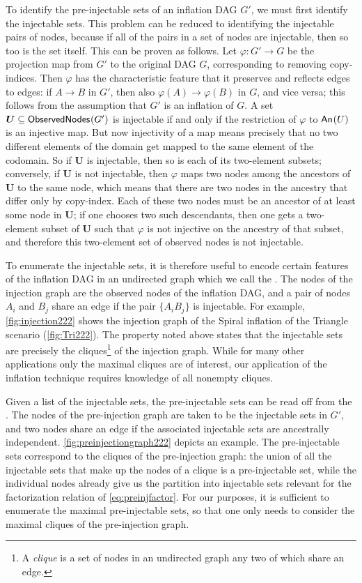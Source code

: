 \documentclass[aps,english,superscriptaddress,onecolumn,twoside,longbibliography,pra,floatfix,fleqn,nofootinbib]{revtex4-1}%
\newcommand*{\tblue}[1]{{\color{MidnightBlue}{\textbf{#1}}}}
\theoremstyle{definition}
\newcounter{example}[section]
\newcommand{\An}[2][]{{\mathsf{An}_{#1}}\parenths{#2}}
\newcommand{\SmallNamedFunction}[3][]{\operatorname{\mathsf{#2}}_{#1}\parenths{#3}}
\newcommand{\obsnodes}[1]{\SmallNamedFunction{ObservedNodes}{#1}}
\DeclarePairedDelimiter{\parenths}{\lparen}{\rparen}
\begin{document}
To identify the pre-injectable sets of an inflation DAG $G'$, we must first identify the injectable sets. This problem can be reduced to identifying the injectable pairs of nodes, because if all of the pairs in a set of nodes are injectable, then so too is the set itself. This can be proven as follows.   
Let $\varphi : G' \to G$ be the projection map from $G'$ to the original DAG $G$, corresponding to removing copy-indices.  Then $\varphi$ has the characteristic feature that it preserves and reflects edges to edges: if $A  \to B$ in $G'$, then also $\varphi(A) \to \varphi(B)$ in $G$, and vice versa; this follows from the assumption that $G'$ is an inflation of $G$. 
A set $\bm{U} \subseteq \obsnodes{G'}$ is injectable if and only if the
restriction of $\varphi$ to $\An{U}$ is an injective map. 
But now injectivity of a map means precisely that no two different
elements of the domain get mapped to the same element of the codomain.
So if $\bm{U}$ is injectable, then so is each of its two-element subsets;
conversely, if $\bm{U}$ is not injectable, then $\varphi$ maps two nodes among the
ancestors of $\bm{U}$ to the same node, which means that there are two nodes in the
ancestry that differ only by copy-index. Each of these two nodes must be
an ancestor of at least some node in $\bm{U}$; if one chooses two such
descendants, then one gets a two-element subset of $\bm{U}$ such that $\varphi$ is not
injective on the ancestry of that subset, and therefore this two-element
set of observed nodes is not injectable.

To enumerate the injectable sets, it is therefore useful to encode certain features of the inflation DAG in an undirected graph which we call the \tblue{injection graph}. The nodes of the injection graph are the observed nodes of the inflation DAG, and a pair of nodes $A_i$ and $B_j$ share an edge if the pair $\{ A_i B_j\}$ is injectable. For example, \cref{fig:injection222} shows the injection graph of the Spiral inflation of the Triangle scenario (\cref{fig:Tri222}).
The property noted above states that the injectable sets are precisely the cliques\footnote{A \emph{clique} is a set of nodes in an undirected graph any two of which share an edge.} of the injection graph.
While for many other applications only the maximal cliques are of interest, our application of the inflation technique requires knowledge of all nonempty cliques. 

Given a list of the injectable sets, the pre-injectable sets can be read off from the \tblue{pre-injection graph}.
The nodes of the pre-injection graph are taken to be the injectable sets in $G'$, and two nodes share an edge if the associated injectable sets are ancestrally independent.
\cref{fig:preinjectiongraph222} depicts an example. 
The pre-injectable sets correspond to the cliques of the pre-injection graph: the union of all the injectable sets that make up the nodes of a clique is a pre-injectable set, while the individual nodes already give us the partition into injectable sets relevant for the factorization relation of \cref{eq:preinjfactor}. 
For our purposes, it is sufficient to enumerate the maximal pre-injectable sets, so that one only needs to consider the maximal cliques of the pre-injection graph.
\end{document}
